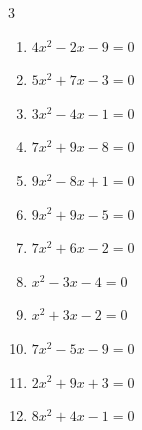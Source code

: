 \begin{multicols}{3}
\begin{enumerate}

  \item $4x^{2}-2x-9=0$


  \item $5x^{2}+7x-3=0$


  \item $3x^{2}-4x-1=0$


  \item $7x^{2}+9x-8=0$


  \item $9x^{2}-8x+1=0$


\columnbreak %

  \item $9x^{2}+9x-5=0$


  \item $7x^{2}+6x-2=0$


  \item $x^{2}-3x-4=0$

        \phantom{$\displaystyle x=4, \; -1$}

  \item $x^{2}+3x-2=0$


  \item $7x^{2}-5x-9=0$


  \item $2x^{2}+9x+3=0$


  \item $8x^{2}+4x-1=0$



\end{enumerate}
\end{multicols}
